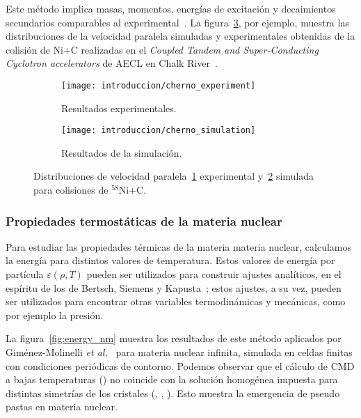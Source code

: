 Este método implica masas, momentos, energías de excitación y decaimientos secundarios comparables al experimental~\cite{belkacem_searching_1996,chernomoretz_quasiclassical_2002}.
La figura~\ref{fig:distribution_vel}, por ejemplo, muestra las distribuciones de la velocidad paralela simuladas y experimentales obtenidas de la colisión de $\text{Ni+C}$ realizadas en el \emph{Coupled Tandem and Super-Conducting Cyclotron accelerators} de AECL en Chalk River~\cite{chernomoretz_quasiclassical_2002}.

\begin{figure}[h]
  \begin{subfigure}[h!]{0.48\columnwidth}
    \texttt{[image: introduccion/cherno\_experiment]}
    \caption{Resultados experimentales.}
    \label{sfig:exp}
  \end{subfigure}
  \begin{subfigure}[h!]{0.48\columnwidth}
    \texttt{[image: introduccion/cherno\_simulation]}
    \caption{Resultados de la simulación.}
    \label{sfig:sim}
  \end{subfigure}
  \centering
  \caption{Distribuciones de velocidad paralela~\ref{sfig:exp} experimental y~\ref{sfig:sim} simulada para colisiones de ${}^{58}\text{Ni+C}$.}
  \label{fig:distribution_vel}
\end{figure}


\subsubsection{Propiedades termostáticas de la materia nuclear}
Para estudiar las propiedades térmicas de la materia materia nuclear, calculamos la energía para distintos valores de temperatura.
Estos valores de energía por partícula $\varepsilon(\rho,T)$ pueden ser utilizados para construir ajustes analíticos, en el espíritu de los de Bertsch, Siemens y Kapusta~\cite{bertsch_nuclear_1983, kapusta_deuteron_1984,
  lopez_nuclear_1984}; estos ajustes, a su vez, pueden ser utilizados para encontrar otras variables termodinámicas y mecánicas, como por ejemplo la presión.

La figura~\ref{fig:energy_nm} muestra los resultados de este método aplicados por Giménez-Molinelli \emph{et al.}~\cite{gimenez_molinelli_simulations_2014} para materia nuclear infinita, simulada en celdas finitas con condiciones periódicas de contorno.
Podemos observar que el cálculo de CMD a bajas temperaturas () no coincide con la solución homogénea impuesta para distintas simetrías de los cristales (, , ).
Esto muestra la emergencia de pseudo pastas en materia nuclear.

